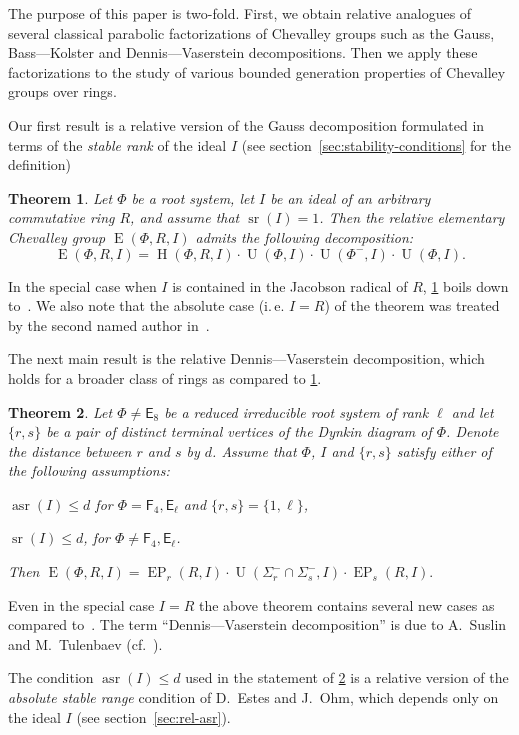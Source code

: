 \documentclass[oneside, 12pt]{amsart}
\theoremstyle{plain}
\newtheorem{thm}{Theorem}
\numberwithin{equation}{section}
\numberwithin{lemma}{section}
\theoremstyle{definition}
\theoremstyle{remark}
\DeclareMathOperator{\E}{E}
\DeclareMathOperator{\EP}{EP}
\DeclareMathOperator{\Hh}{H}
\DeclareMathOperator{\U}{U}
\DeclareMathOperator{\sr}{sr}
\DeclareMathOperator{\asr}{asr}
\newcommand{\rE}{\mathsf{E}}
\newcommand{\rF}{\mathsf{F}}
\begin{document}
The purpose of this paper is two-fold. 
First, we obtain relative analogues of several classical parabolic factorizations of Chevalley groups such as the Gauss, Bass---Kolster and Dennis---Vaserstein decompositions.
Then we apply these factorizations to the study of various bounded generation properties of Chevalley groups over rings.

Our first result is a relative version of the Gauss decomposition formulated in terms of the \emph{stable rank} of the ideal $I$ (see section~\ref{sec:stability-conditions} for the definition)
\begin{thm}\label{thm:srRI1}
Let $\Phi$ be a root system, let $I$ be an ideal of an arbitrary commutative ring $R$, and assume that $\sr(I)=1$.
Then the relative elementary Chevalley group $\E(\Phi, R, I)$ admits the following decomposition:
\[ \E(\Phi, R, I) = \Hh(\Phi, R, I) \cdot \U(\Phi, I) \cdot \U(\Phi^-, I) \cdot \U(\Phi, I). \]
\end{thm}
In the special case when $I$ is contained in the Jacobson radical of $R$, \cref{thm:srRI1} boils down to~\cite[Proposition~2.3]{Abe76}. 
We also note that the absolute case (i.\,e. $I=R$) of the theorem was treated by the second named author in~\cite{Sm12}.

The next main result is the relative Dennis---Vaserstein decomposition, which holds for a broader class of rings as compared to \cref{thm:srRI1}.
\begin{thm}\label{thm:DennisVaserstein}
Let $\Phi \neq \rE_8$ be a reduced irreducible root system of rank $\ell$ and let $\{ r, s \}$ be a pair of distinct terminal vertices of the Dynkin diagram of $\Phi$. Denote the distance between $r$ and $s$ by $d$.
Assume that $\Phi$, $I$ and $\{r, s\}$ satisfy either of the following assumptions:
\begin{thmlist}
 \item $\asr(I) \leqslant d$ for $\Phi=\rF_4, \rE_\ell$ and $\{r, s\} = \{1, \ell \}$, 
 \item $\sr(I) \leqslant d$, for $\Phi\neq\rF_4, \rE_\ell$.
\end{thmlist}
Then $\E(\Phi, R, I) = \EP_r(R, I) \cdot \U(\Sigma^-_r \cap \Sigma^-_s, I) \cdot \EP_s(R, I).$ \end{thm}
Even in the special case $I=R$ the above theorem contains several new cases as compared to~\cite[Theorems~2.5 and~4.1]{St78}.
The term ``Dennis---Vaserstein decomposition'' is due to A.~Suslin and M.~Tulenbaev (cf.~\cite[Lemma~2.1]{ST76}).

The condition $\asr(I) \leq d$ used in the statement of \cref{thm:DennisVaserstein} is a relative version of the \emph{absolute stable range} condition of D.~Estes and J.~Ohm, which depends only on the ideal $I$ (see section~\ref{sec:rel-asr}).
\end{document}
